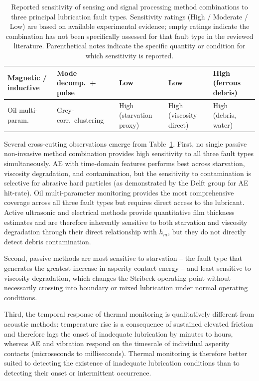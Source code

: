 \begin{table}[H]
\begin{tabularx}{\linewidth}{|
>{\raggedright\arraybackslash}p{2.5cm}
| >{\raggedright\arraybackslash}p{2.2cm}
| >{\centering\arraybackslash}X
| >{\centering\arraybackslash}X
| >{\centering\arraybackslash}X |}
\hline
Magnetic / inductive & Mode decomp.\ + pulse & Low & Low & High (ferrous debris) \cite{sun_online_2021,yu_novel_2021} \\
\hline
Oil multi-param. & Grey-corr.\ clustering & High (starvation proxy) \cite{wang_evaluation_2018} & High (viscosity direct) \cite{wang_evaluation_2018} & High (debris, water) \cite{wang_evaluation_2018} \\
\hline
\end{tabularx}
\caption{Reported sensitivity of sensing and signal processing method combinations to three principal lubrication fault types. Sensitivity ratings (High / Moderate / Low) are based on available experimental evidence; empty ratings indicate the combination has not been specifically assessed for that fault type in the reviewed literature. Parenthetical notes indicate the specific quantity or condition for which sensitivity is reported.}
\label{tab:fault_sensitivity}
\end{table}

Several cross-cutting observations emerge from Table~\ref{tab:fault_sensitivity}. First, no single passive non-invasive method combination provides high sensitivity to all three fault types simultaneously. AE with time-domain features performs best across starvation, viscosity degradation, and contamination, but the sensitivity to contamination is selective for abrasive hard particles (as demonstrated by the Delft group for AE hit-rate). Oil multi-parameter monitoring provides the most comprehensive coverage across all three fault types but requires direct access to the lubricant. Active ultrasonic and electrical methods provide quantitative film thickness estimates and are therefore inherently sensitive to both starvation and viscosity degradation through their direct relationship with $h_m$, but they do not directly detect debris contamination.

Second, passive methods are most sensitive to starvation -- the fault type that generates the greatest increase in asperity contact energy -- and least sensitive to viscosity degradation, which changes the Stribeck operating point without necessarily crossing into boundary or mixed lubrication under normal operating conditions.

Third, the temporal response of thermal monitoring is qualitatively different from acoustic methods: temperature rise is a consequence of sustained elevated friction and therefore lags the onset of inadequate lubrication by minutes to hours, whereas AE and vibration respond on the timescale of individual asperity contacts (microseconds to milliseconds). Thermal monitoring is therefore better suited to detecting the existence of inadequate lubrication conditions than to detecting their onset or intermittent occurrence.

